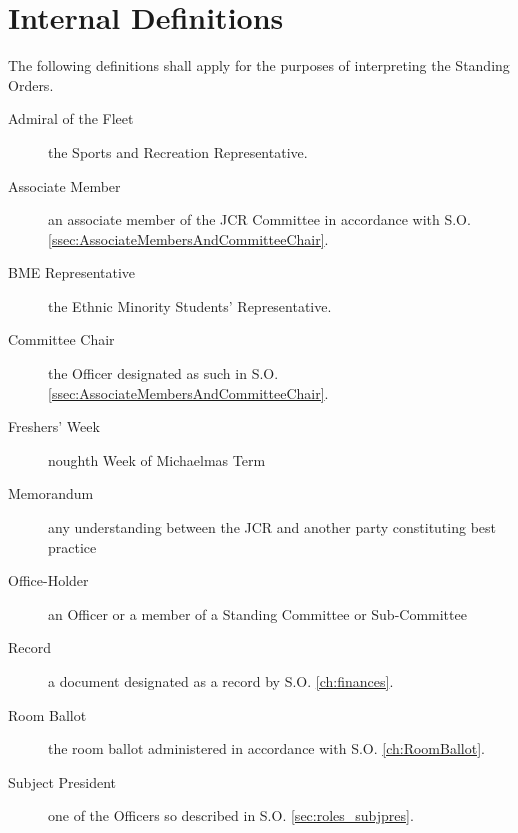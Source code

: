 \chapter{Internal Definitions} \label{App:InternalDefs}

\appnpara The following definitions shall apply for the purposes of interpreting the Standing Orders.
\begin{description}
\item[Admiral of the Fleet] the Sports and Recreation Representative.
\item[Associate Member] an associate member of the JCR Committee in accordance with S.O. \ref{ssec:AssociateMembersAndCommitteeChair}.
\item[BME Representative] the Ethnic Minority Students’ Representative.
\item[Committee Chair] the Officer designated as such in S.O. \ref{ssec:AssociateMembersAndCommitteeChair}.
\item[Freshers' Week] noughth Week of Michaelmas Term
\item[Memorandum] any understanding between the JCR and another party constituting best practice 
\item[Office-Holder] an Officer or a member of a Standing Committee or Sub-Committee
\item[Record] a document designated as a record by S.O. \ref{ch:finances}.
\item[Room Ballot] the room ballot administered in accordance with S.O. \ref{ch:RoomBallot}.
\item[Subject President] one of the Officers so described in S.O. \ref{sec:roles_subjpres}.
\end{description}